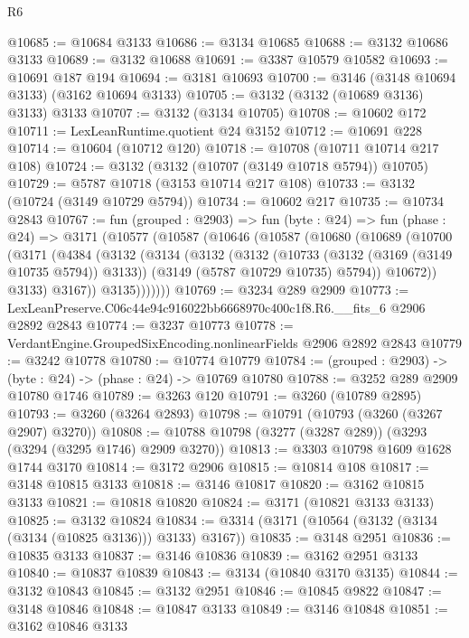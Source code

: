 \begin{lexlean}{R6}
\begin{coremodule}
@10685 := @10684 @3133
@10686 := @3134 @10685
@10688 := @3132 @10686 @3133
@10689 := @3132 @10688
@10691 := @3387 @10579 @10582
@10693 := @10691 @187 @194
@10694 := @3181 @10693
@10700 := @3146 (@3148 @10694 @3133) (@3162 @10694 @3133)
@10705 := @3132 (@3132 (@10689 @3136) @3133) @3133
@10707 := @3132 (@3134 @10705)
@10708 := @10602 @172
@10711 := LexLeanRuntime.quotient @24 @3152
@10712 := @10691 @228
@10714 := @10604 (@10712 @120)
@10718 := @10708 (@10711 @10714 @217 @108)
@10724 := @3132 (@3132 (@10707 (@3149 @10718 @5794)) @10705)
@10729 := @5787 @10718 (@3153 @10714 @217 @108)
@10733 := @3132 (@10724 (@3149 @10729 @5794))
@10734 := @10602 @217
@10735 := @10734 @2843
@10767 := fun (grouped : @2903) =>
  fun (byte : @24) =>
  fun (phase : @24) =>
  @3171
    (@10577
      (@10587
        (@10646
          (@10587
            (@10680
              (@10689
                (@10700
                  (@3171
                    (@4384
                      (@3132
                        (@3134
                          (@3132
                            (@3132
                              (@10733 (@3132 (@3169 (@3149 @10735 @5794)) @3133))
                              (@3149 (@5787 @10729 @10735) @5794))
                            @10672))
                        @3133)
                      @3167))
                  @3135)))))))
@10769 := @3234 @289 @2909
@10773 := LexLeanPreserve.C06c44e94c916022bb6668970c400c1f8.R6.__fits_6 @2906 @2892 @2843
@10774 := @3237 @10773
@10778 := VerdantEngine.GroupedSixEncoding.nonlinearFields @2906 @2892 @2843
@10779 := @3242 @10778
@10780 := @10774 @10779
@10784 := (grouped : @2903) -> (byte : @24) -> (phase : @24) -> @10769 @10780
@10788 := @3252 @289 @2909 @10780 @1746
@10789 := @3263 @120
@10791 := @3260 (@10789 @2895)
@10793 := @3260 (@3264 @2893)
@10798 := @10791 (@10793 (@3260 (@3267 @2907) @3270))
@10808 := @10788 @10798 (@3277 (@3287 @289)) (@3293 (@3294 (@3295 @1746) @2909 @3270))
@10813 := @3303 @10798 @1609 @1628 @1744 @3170
@10814 := @3172 @2906
@10815 := @10814 @108
@10817 := @3148 @10815 @3133
@10818 := @3146 @10817
@10820 := @3162 @10815 @3133
@10821 := @10818 @10820
@10824 := @3171 (@10821 @3133 @3133)
@10825 := @3132 @10824
@10834 := @3314 (@3171 (@10564 (@3132 (@3134 (@3134 (@10825 @3136))) @3133) @3167))
@10835 := @3148 @2951
@10836 := @10835 @3133
@10837 := @3146 @10836
@10839 := @3162 @2951 @3133
@10840 := @10837 @10839
@10843 := @3134 (@10840 @3170 @3135)
@10844 := @3132 @10843
@10845 := @3132 @2951
@10846 := @10845 @9822
@10847 := @3148 @10846
@10848 := @10847 @3133
@10849 := @3146 @10848
@10851 := @3162 @10846 @3133

\end{coremodule}
\end{lexlean}

